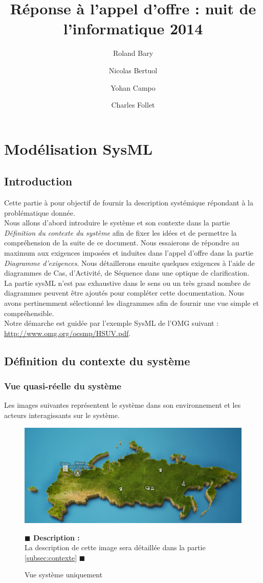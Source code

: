 \documentclass[11pt, titlepage]{report}
\title{\textbf{ Réponse à l'appel d'offre : nuit de l'informatique 2014}}
\author{Roland Bary \and Nicolas Bertuol \and Yohan Campo \and Charles Follet}
\newcommand{\debutDescription}{\noindent\textbf{\textcolor{DescriptionColor}{$\blacksquare$  Description : \\}}}
\newcommand{\finDescription}{\noindent\textcolor{DescriptionColor}{$\blacksquare$}}
\begin{document}
\maketitle
\tableofcontents
\clearpage
\listoffigures
\clearpage
\chapter{Modélisation SysML}
\section{Introduction}
Cette partie à pour objectif de fournir la description systémique répondant à la problématique donnée. \\
Nous allons d'abord introduire le système et son contexte dans la partie \textit{Définition du contexte du système} afin de fixer les idées et de permettre la compréhension de la suite de ce document. Nous essaierons de répondre au maximum aux exigences imposées et induites dans l'appel d'offre dans la partie \textit{Diagramme d'exigences}. Nous détaillerons ensuite quelques exigences à l'aide de diagrammes de Cas, d'Activité, de Séquence dans une optique de clarification.\\ 
La partie sysML n'est pas exhaustive dans le sens ou un très grand nombre de diagrammes peuvent être ajoutés pour compléter cette documentation. Nous avons pertinemment sélectionné les diagrammes afin de fournir une vue simple et compréhensible.\\
Notre démarche est guidée par l'exemple SysML de l'OMG suivant : \url{http://www.omg.org/ocsmp/HSUV.pdf}.
\clearpage
\section{Définition du contexte du système}
\subsection{Vue quasi-réelle du système}
Les images suivantes représentent le système dans son environnement et les acteurs interagissants sur le système. 

\begin{figure}[h!]
\begin{center}
\includegraphics[scale=.18]{../images/schemas/humanitaire_system.png}
\caption{Vue système uniquement}
\end{center}
\debutDescription
La description de cette image sera détaillée dans la partie \ref{subsec:contexte}
\finDescription
\end{figure}
\end{document}
